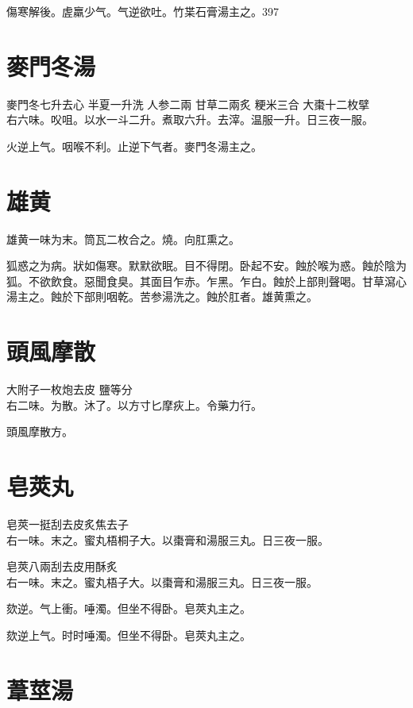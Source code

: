 傷寒解後。虗羸少气。气逆欲吐。竹枼石膏湯主之。397

\section{麥門冬湯}

麥門冬{\scriptsize 七升去心} 半夏{\scriptsize 一升洗} 人参{\scriptsize 二兩} 甘草{\scriptsize 二兩炙} 粳米{\scriptsize 三合} 大棗{\scriptsize 十二枚擘}\\
右六味。㕮咀。以水一斗二升。煮取六升。去滓。温服一升。日三夜一服。

火逆上气。咽喉不利。止逆下气者。麥門冬湯主之。

\section{雄黄}

雄黄一味为末。筒瓦二枚合之。燒。向肛熏之。

狐惑之为病。狀如傷寒。默默欲眠。目不得閉。卧起不安。蝕於喉为惑。蝕於陰为狐。不欲飲食。惡聞食臭。其面目乍赤。乍黑。乍白。蝕於上部則聲喝。甘草瀉心湯主之。蝕於下部則咽乾。苦参湯洗之。蝕於肛者。雄黄熏之。

\section{頭風摩散}

大附子{\scriptsize 一枚炮去皮} 鹽{\scriptsize 等分}\\
右二味。为散。沐了。以方寸匕摩疢上。令藥力行。

頭風摩散方。

\section{皂莢丸}

皂莢{\scriptsize 一挺刮去皮炙焦去子}\\
右一味。末之。蜜丸梧桐子大。以棗膏和湯服三丸。日三夜一服。{\wuben}

皂莢{\scriptsize 八兩刮去皮用酥炙}\\
右一味。末之。蜜丸梧子大。以棗膏和湯服三丸。日三夜一服。{\dengben}

欬逆。气上衝。唾濁。但坐不得卧。皂莢丸主之。{\wuben}

欬逆上气。时时唾濁。但坐不得卧。皂莢丸主之。{\dengben}

\section{葦莖湯}

